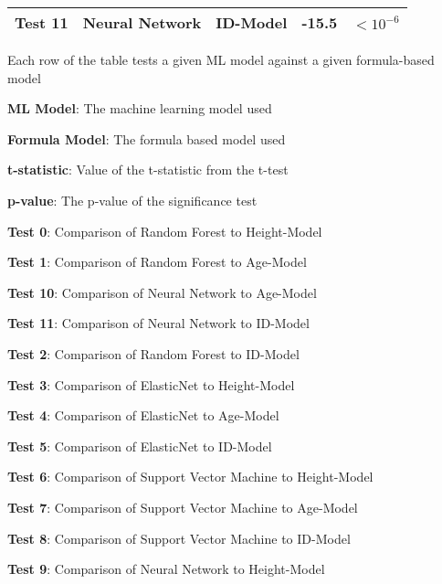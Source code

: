 \documentclass[11pt]{article}
\begin{document}
\begin{table}[h]
\begin{threeparttable}
{\begin{tabular}{lllrl}
\textbf{Test \raisebox{2ex}{\hypertarget{C11a}{}}11} & Neural Network & ID-Model & \raisebox{2ex}{\hypertarget{C11b}{}}-15.5 & $<$\raisebox{2ex}{\hypertarget{C11c}{}}$10^{-6}$ \\
\bottomrule
\end{tabular}}
\begin{tablenotes}
\footnotesize
\item Each row of the table tests a given ML model against a given formula-based model
\item \textbf{ML Model}: The machine learning model used
\item \textbf{Formula Model}: The formula based model used
\item \textbf{t-statistic}: Value of the t-statistic from the t-test
\item \textbf{p-value}: The p-value of the significance test
\item \textbf{Test 0}: Comparison of Random Forest to Height-Model
\item \textbf{Test 1}: Comparison of Random Forest to Age-Model
\item \textbf{Test 10}: Comparison of Neural Network to Age-Model
\item \textbf{Test 11}: Comparison of Neural Network to ID-Model
\item \textbf{Test 2}: Comparison of Random Forest to ID-Model
\item \textbf{Test 3}: Comparison of ElasticNet to Height-Model
\item \textbf{Test 4}: Comparison of ElasticNet to Age-Model
\item \textbf{Test 5}: Comparison of ElasticNet to ID-Model
\item \textbf{Test 6}: Comparison of Support Vector Machine to Height-Model
\item \textbf{Test 7}: Comparison of Support Vector Machine to Age-Model
\item \textbf{Test 8}: Comparison of Support Vector Machine to ID-Model
\item \textbf{Test 9}: Comparison of Neural Network to Height-Model
\end{tablenotes}
\end{threeparttable}
\end{table}
\end{document}

